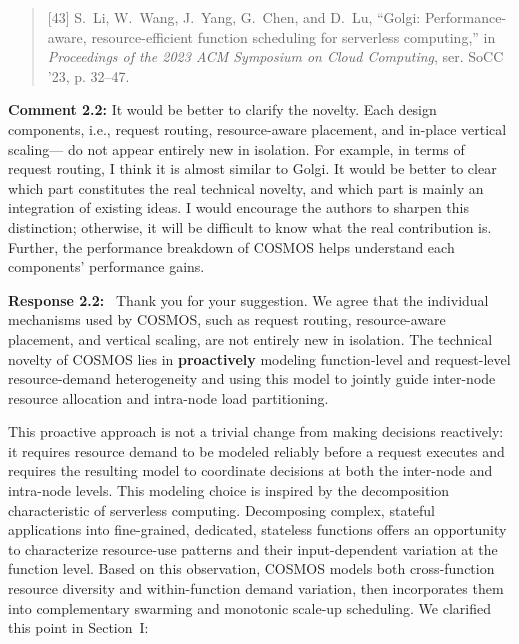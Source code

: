 \documentclass[11pt]{article}
\newcommand{\response}[1]{\par\medskip\noindent\textbf{Response #1:}\ }
\begin{document}
\begin{quote}\small
[43] S.~Li, W.~Wang, J.~Yang, G.~Chen, and D.~Lu, ``Golgi: Performance-aware, resource-efficient function scheduling for serverless computing,'' in \emph{Proceedings of the 2023 ACM Symposium on Cloud Computing}, ser. SoCC '23, p. 32--47.
\end{quote}

\begin{reviewcomment}
\textbf{Comment 2.2:} It would be better to clarify the novelty. Each design components, i.e., request routing, resource-aware placement, and in-place vertical scaling--- do not appear entirely new in isolation. For example, in terms of request routing, I think it is almost similar to Golgi. It would be better to clear which part constitutes the real technical novelty, and which part is mainly an integration of existing ideas. I would encourage the authors to sharpen this distinction; otherwise, it will be difficult to know what the real contribution is. Further, the performance breakdown of COSMOS helps understand each components' performance gains.
\end{reviewcomment}
\response{2.2} Thank you for your suggestion. We agree that the individual mechanisms used by COSMOS, such as request routing, resource-aware placement, and vertical scaling, are not entirely new in isolation. The technical novelty of COSMOS lies in \textbf{proactively} modeling function-level and request-level resource-demand heterogeneity and using this model to jointly guide inter-node resource allocation and intra-node load partitioning.

This proactive approach is not a trivial change from making decisions reactively: it requires resource demand to be modeled reliably before a request executes and requires the resulting model to coordinate decisions at both the inter-node and intra-node levels. This modeling choice is inspired by the decomposition characteristic of serverless computing. Decomposing complex, stateful applications into fine-grained, dedicated, stateless functions offers an opportunity to characterize resource-use patterns and their input-dependent variation at the function level. Based on this observation, COSMOS models both cross-function resource diversity and within-function demand variation, then incorporates them into complementary swarming and monotonic scale-up scheduling. We clarified this point in Section~I:
\end{document}

